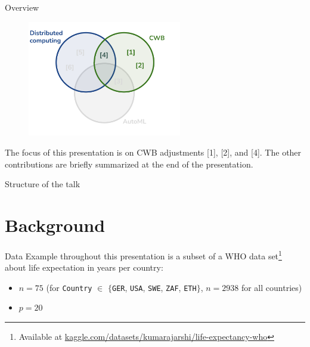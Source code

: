 \documentclass[t,10pt]{beamer}
\begin{document}

\begin{frame}{Overview}
  \begin{figure}
    \centering
    \includegraphics[width=0.6\textwidth]{figures/topics-relevant.png}
  \end{figure}\vspace{-0.2cm}
  The focus of this presentation is on CWB adjustments {[}1{]}, {[}2{]}, and {[}4{]}. The other contributions are briefly summarized at the end of the presentation.
    \addtocounter{framenumber}{-1}
\end{frame}


\begin{frame}[plain]{Structure of the talk}
    \tableofcontents
    \addtocounter{framenumber}{-1}
\end{frame}



\section{Background}

\begin{frame}{Data}
  Example throughout this presentation is a subset of a WHO data set\footnote[frame,1]{Available at \url{kaggle.com/datasets/kumarajarshi/life-expectancy-who}} about life expectation in years per country:

  \scriptsize
  
  \normalsize
  \begin{itemize}
      \item  
        $n = 75$ (for \texttt{Country} $\in$ $\{$\texttt{GER}, \texttt{USA}, \texttt{SWE}, \texttt{ZAF}, \texttt{ETH}$\}$, $n = 2938$ for all countries) 
      \item $p = 20$
  \end{itemize}
\end{frame}
\end{document}
